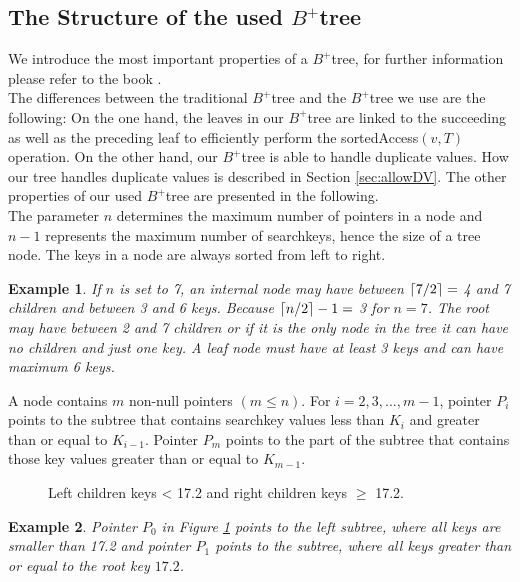 \documentclass[abstracton,12pt,oneside]{scrreprt}
\DeclarePairedDelimiter\ceil{\lceil}{\rceil}
\newtheorem{example}{Example}
\begin{document}
\subsection{The Structure of the used $B^+$tree}
\label{structureBtree}
We introduce the most important properties of a $B^+$tree, for further information please refer to the book \cite{DatabaseSystemC}.\\
The differences between the traditional $B^+$tree and the $B^+$tree we use are the following: On the one hand, the leaves in our $B^+$tree are linked to the succeeding as well as the preceding leaf to efficiently perform the sortedAccess$(v,T)$ operation. On the other hand, our $B^+$tree is able to handle duplicate values. How our tree handles duplicate values is described in Section \ref{sec:allowDV}. The other properties of our used $B^+$tree are presented in the following.\\
The parameter $n$ determines the maximum number of pointers in a node and $n-1$ represents the maximum number of searchkeys, hence the size of a tree node. The keys in a node are always sorted from left to right. 
\begin{example}
	If $n$ is set to 7, an internal node may have between $\ceil{7/2} =$ 4 and 7 children and between 3 and 6 keys. Because $\ceil{n/2}-1 =$ 3 for $n=7$. The root may have between 2 and 7 children or if it is the only node in the tree it can have no children and just one key. A leaf node must have at least 3 keys and can have maximum 6 keys.
\end{example}
A node contains $m$ non-null pointers $\left(m \leq n\right)$. For $i = 2, 3, . . . ,m-1$, pointer $P_i$ points to the subtree that contains searchkey values less than $K_i$ and greater than or equal to $K_{i-1}$. Pointer $P_m$ points to the part of the subtree that contains those key values greater than or equal to $K_{m-1}$. 

\begin{figure}[H]
	\centering
	\vspace{2mm}
	\caption{Left children keys < 17.2 and right children keys $\geq$ 17.2.}
	\label{fig:little}
\end{figure} 
\begin{example}
	Pointer $P_0$ in Figure \ref{fig:little} points to the left subtree, where all keys are smaller than 17.2 and pointer $P_1$ points to the subtree, where all keys greater than or equal to the root key $17.2$.
\end{example}
\end{document}
